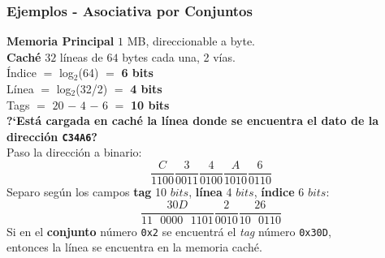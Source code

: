 \documentclass[aspectratio=169]{beamer}
\begin{document}
\begin{frame}[t]
    \frametitle{Ejemplos - Asociativa por Conjuntos}
    \small 
    \textbf{Memoria Principal} $1$ MB, direccionable a byte.\\
    \textbf{Caché}  $32$ l\'ineas de $64$ bytes cada una, 2 v\'ias.\\
    \bigskip
    \textcolor{naranjauca}{Índice} $=$ log$_2$(64) $=$ \textbf{6 bits}\\
    \textcolor{naranjauca}{Línea} $=$ log$_2$(32/2) $=$ \textbf{4 bits}\\
    \textcolor{naranjauca}{Tags} $=$ $20$ $-$ $4$ $-$ $6$ $=$ \textbf{10 bits}\\
    \bigskip
    \textbf{?`Está cargada en caché la línea donde se encuentra el dato de la direcci\'on \texttt{C34A6}?}\\
    \vskip 5pt
    \small
    Paso la dirección a binario:\\
    \vskip -15pt
    \begin{equation*}
    \text{}\frac{C}{1100} \frac{3}{0011} \frac{4}{0100} \frac{A}{1010} \frac{6}{0110}
    \end{equation*}
    Separo seg\'un los campos \textbf{tag} 10 $bits$, \textbf{l\'inea} 4 $bits$, \textbf{\'indice} 6 $bits$:\\
    \vskip -5pt
    \begin{equation*}
    \text{}\frac{30D}{11\text{ }0000\text{ }1101} \frac{2}{0010} \frac{26}{10\text{ }0110}
    \end{equation*}
    Si en el \textbf{conjunto} número \texttt{0x2} se encuentrá el \emph{tag} n\'umero \texttt{0x30D},\\
    entonces la línea se encuentra en la memoria caché.
\end{frame}
\end{document}

